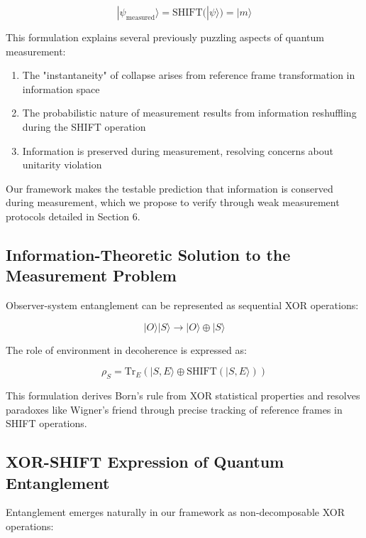 \documentclass[aps,prl,preprint,superscriptaddress,showpacs]{revtex4-2}
\newcommand{\xor}{\oplus}
\newcommand{\shift}{\text{SHIFT}}
\begin{document}
\begin{equation}
|\psi_{\text{measured}}\rangle = \shift(|\psi\rangle) = |m\rangle
\end{equation}

This formulation explains several previously puzzling aspects of quantum measurement:

\begin{enumerate}
\item The "instantaneity" of collapse arises from reference frame transformation in information space
\item The probabilistic nature of measurement results from information reshuffling during the SHIFT operation
\item Information is preserved during measurement, resolving concerns about unitarity violation
\end{enumerate}

Our framework makes the testable prediction that information is conserved during measurement, which we propose to verify through weak measurement protocols detailed in Section 6.

\subsection{Information-Theoretic Solution to the Measurement Problem}

Observer-system entanglement can be represented as sequential XOR operations:

\begin{equation}
|O\rangle|S\rangle \rightarrow |O\rangle \xor |S\rangle
\end{equation}

The role of environment in decoherence is expressed as:

\begin{equation}
\rho_S = \text{Tr}_E(|S,E\rangle \xor \shift(|S,E\rangle))
\end{equation}

This formulation derives Born's rule from XOR statistical properties and resolves paradoxes like Wigner's friend through precise tracking of reference frames in SHIFT operations.

\subsection{XOR-SHIFT Expression of Quantum Entanglement}

Entanglement emerges naturally in our framework as non-decomposable XOR operations:
\end{document}
